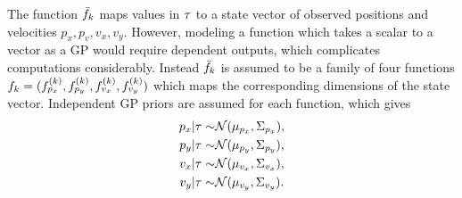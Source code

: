 The function $\bar{f}_{k}$ maps values in $\tau$ to 
a state vector of observed positions and velocities $p_x, p_v, v_x, v_y$.
However, modeling a function which takes a scalar to a vector as a GP
would require dependent outputs, which complicates computations considerably. 
Instead $\bar{f}_{k}$ is assumed to be a family of four functions
$f_{k} = (f^{(k)}_{p_x}, f^{(k)}_{p_y}, f^{(k)}_{v_x}, f^{(k)}_{v_y})$
which maps the corresponding dimensions of the state vector.
Independent GP priors are assumed for each function, which gives
\begin{equation}
  \label{eq:f-posterior}
  \begin{split}
  p_x \vert \tau \sim & \mathcal{N}(\mu_{p_x}, \Sigma_{p_x}), \\
  p_y \vert \tau \sim & \mathcal{N}(\mu_{p_y}, \Sigma_{p_y}), \\
  v_x \vert \tau \sim & \mathcal{N}(\mu_{v_x}, \Sigma_{v_x}), \\
  v_y \vert \tau \sim & \mathcal{N}(\mu_{v_y}, \Sigma_{v_y}).
  \end{split}
\end{equation}

